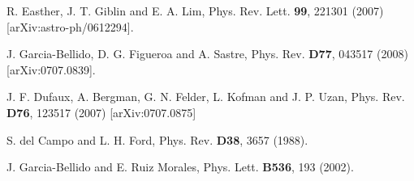 \documentclass[11pt,a4paper,twoside]{book}
\begin{document}
\begin{thebibliography}{2}
	 R. Easther, J. T.  Giblin and E. A. Lim, Phys. Rev. Lett. \textbf{99}, 221301 (2007)  [arXiv:astro-ph/0612294].
	
	 J. Garcia-Bellido, D. G. Figueroa and A. Sastre, Phys. Rev. \textbf{D77}, 043517 (2008) [arXiv:0707.0839].
	
	 J. F. Dufaux, A. Bergman, G. N. Felder, L. Kofman and J. P. Uzan, Phys. Rev. \textbf{D76}, 123517 (2007) [arXiv:0707.0875]
	
	 S. del Campo and L. H. Ford, Phys. Rev. \textbf{D38}, 3657 (1988).
	
	 J. Garcia-Bellido and E. Ruiz Morales, Phys. Lett. \textbf{B536}, 193 (2002).
		
	
\end{thebibliography}	
	
\end{document}
